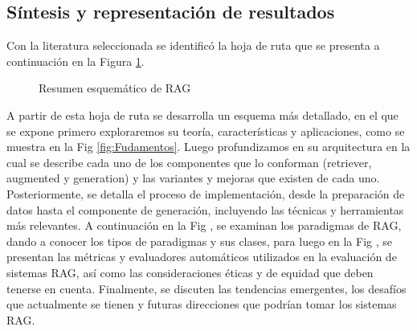 
\subsection{Síntesis y representación de resultados}
Con la literatura seleccionada se identificó la hoja de ruta que se presenta a continuación en la Figura \ref{fig:secciones-rag}.


\begin{figure}[H]
\begin{center}
\end{center}
\caption{Resumen esquemático de RAG}
\label{fig:secciones-rag}
\end{figure}

A partir de esta hoja de ruta se desarrolla un esquema más detallado, en el que se expone primero exploraremos su teoría, 
características y aplicaciones, como se muestra en la Fig \ref{fig:Fudamentos}. Luego profundizamos en su arquitectura en la cual 
se describe cada uno de los componentes que lo conforman (retriever, augmented y generation) y las variantes y mejoras que existen de cada uno. 
Posteriormente, se detalla el proceso de implementación, desde la preparación de datos hasta el componente de generación, incluyendo las técnicas y herramientas más relevantes.
A continuación en la Fig , se examinan los paradigmas de RAG, dando a conocer los tipos de paradigmas y sus clases, para luego en la Fig , se presentan las métricas y evaluadores automáticos 
utilizados en la evaluación de sistemas RAG, así como las consideraciones éticas y de equidad que deben tenerse en cuenta.
Finalmente, se discuten las tendencias emergentes, los desafíos que actualmente se tienen y futuras direcciones que podrían tomar los sistemas RAG.



